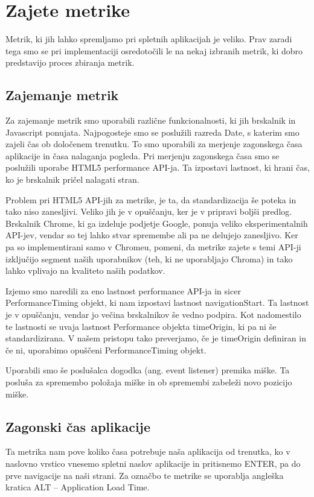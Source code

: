 \documentclass[a4paper, 12pt]{book}
\begin{document}
\chapter{Zajete metrike}
\label{ch2}

Metrik, ki jih lahko spremljamo pri spletnih aplikacijah je veliko. Prav zaradi tega smo se pri implementaciji osredotočili le na nekaj izbranih metrik, ki dobro predstavijo proces zbiranja metrik. 

\section{Zajemanje metrik}

Za zajemanje metrik smo uporabili različne funkcionalnosti, ki jih brskalnik in Javascript ponujata. Najpogosteje smo se poslužili razreda Date, s katerim smo zajeli čas ob določenem trenutku. To smo uporabili za merjenje zagonskega časa aplikacije in časa nalaganja pogleda. Pri merjenju zagonskega časa smo se poslužili uporabe HTML5 performance API-ja. Ta izpostavi lastnost, ki hrani čas, ko je brskalnik pričel nalagati stran.

Problem pri HTML5 API-jih za metrike, je ta, da standardizacija še poteka in tako niso zanesljivi. Veliko jih je v opuščanju, ker je v pripravi boljši predlog. Brskalnik Chrome, ki ga izdeluje podjetje Google, ponuja veliko eksperimentalnih API-jev, vendar so tej lahko stvar spremembe ali pa ne delujejo zanesljivo. Ker pa so implementirani samo v Chromeu, pomeni, da metrike zajete s temi API-ji izključijo segment naših uporabnikov (teh, ki ne uporabljajo Chroma) in tako lahko vplivajo na kvaliteto naših podatkov.

Izjemo smo naredili za eno lastnost performance API-ja in sicer PerformanceTiming objekt, ki nam izpostavi lastnost navigationStart. Ta lastnost je v opuščanju, vendar jo večina brskalnikov še vedno podpira. Kot nadomestilo te lastnosti se uvaja lastnost Performance objekta timeOrigin, ki pa ni še standardizirana. V našem pristopu tako preverjamo, če je timeOrigin definiran in če ni, uporabimo opuščeni PerformanceTiming objekt.

Uporabili smo še poslušalca dogodka (ang. event listener) premika miške. Ta posluša za spremembo položaja miške in ob spremembi zabeleži novo pozicijo miške.

\section{Zagonski čas aplikacije}
\label{ch2:sec1}
Ta metrika nam pove koliko časa potrebuje naša aplikacija od trenutka, ko v naslovno vrstico vnesemo spletni naslov aplikacije in pritisnemo ENTER, pa do prve navigacije na naši strani. Za označbo te metrike se uporablja angleška kratica ALT – Application Load Time.
\end{document}
